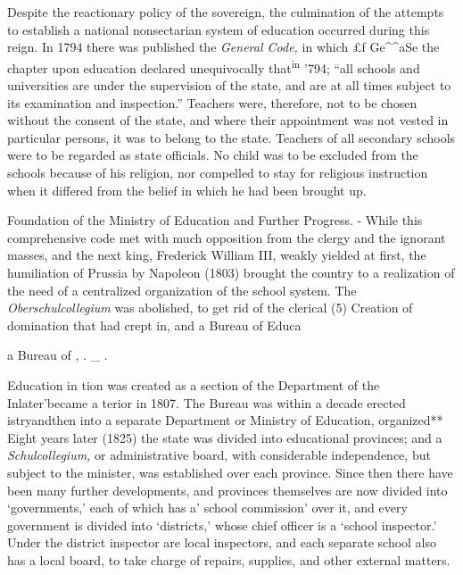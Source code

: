 \documentclass[]{book}
\begin{document}
Despite the reactionary policy of the sovereign, the culmination of the attempts to establish a national nonsectarian system of education occurred during this reign. In 1794 there was published the \emph{General Code,} in which £f Ge\^{}\^{}aSe the chapter upon education declared unequivocally that\textsuperscript{in} '794; ``all schools and universities are under the supervision of the state, and are at all times subject to its examination and inspection.'' Teachers were, therefore, not to be chosen without the consent of the state, and where their appointment was not vested in particular persons, it was to belong to the state. Teachers of all secondary schools were to be regarded as state officials. No child was to be excluded from the schools because of his religion, nor compelled to stay for religious instruction when it differed from the belief in which he had been brought up.

Foundation of the Ministry of Education and Further Progress. - While this comprehensive code met with much opposition from the clergy and the ignorant masses, and the next king, Frederick William III, weakly yielded at first, the humiliation of Prussia by Napoleon (1803) brought the country to a realization of the need of a centralized organization of the school system. The \emph{Oberschulcollegium} was abolished, to get rid of the clerical\protect\hypertarget{ch25.xmlux5cux23para.451.1.0.box.85.234.1259.42.q.60}{}{ (5) Creation of domination that had crept in, and a Bureau of Educa}

a Bureau of , . \_ .

Education in tion was created as a section of the Department of the Inlater'became a terior in 1807. The Bureau was within a decade erected istryandthen into a separate Department or Ministry of Education, organized** Eight years later (1825) the state was divided into educational provinces; and a \emph{Schulcollegium,} or administrative board, with considerable independence, but subject to the minister, was established over each province. Since then there have been many further developments, and provinces themselves are now divided into `governments,' each of which has a' school commission' over it, and every government is divided into `districts,' whose chief officer is a `school inspector.' Under the district inspector are local inspectors, and each separate school also has a local board, to take charge of repairs, supplies, and other external matters.
\end{document}
